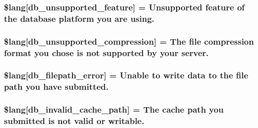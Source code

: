 \subsubsection[{\$lang}]{\setlength{\rightskip}{0pt plus 5cm}\$lang\mbox{[}\textquotesingle{}db\+\_\+unsupported\+\_\+feature\textquotesingle{}\mbox{]} = \textquotesingle{}Unsupported feature of the database platform you are using.\textquotesingle{}}\label{_admin_2system_2language_2english_2db__lang_8php_ac9a47dcf094e785346ea1834e63df941}
\hypertarget{_admin_2system_2language_2english_2db__lang_8php_ae745d23d59478f529442768816df6f36}{}
\subsubsection[{\$lang}]{\setlength{\rightskip}{0pt plus 5cm}\$lang\mbox{[}\textquotesingle{}db\+\_\+unsupported\+\_\+compression\textquotesingle{}\mbox{]} = \textquotesingle{}The file compression format you chose is not supported by your server.\textquotesingle{}}\label{_admin_2system_2language_2english_2db__lang_8php_ae745d23d59478f529442768816df6f36}
\hypertarget{_admin_2system_2language_2english_2db__lang_8php_a0519c50a806cec99f29b499aec2582e5}{}
\subsubsection[{\$lang}]{\setlength{\rightskip}{0pt plus 5cm}\$lang\mbox{[}\textquotesingle{}db\+\_\+filepath\+\_\+error\textquotesingle{}\mbox{]} = \textquotesingle{}Unable to write data to the file path you have submitted.\textquotesingle{}}\label{_admin_2system_2language_2english_2db__lang_8php_a0519c50a806cec99f29b499aec2582e5}
\hypertarget{_admin_2system_2language_2english_2db__lang_8php_a67157df2896b342e247ab744adf2b9e5}{}
\subsubsection[{\$lang}]{\setlength{\rightskip}{0pt plus 5cm}\$lang\mbox{[}\textquotesingle{}db\+\_\+invalid\+\_\+cache\+\_\+path\textquotesingle{}\mbox{]} = \textquotesingle{}The cache path you submitted is not valid or writable.\textquotesingle{}}\label{_admin_2system_2language_2english_2db__lang_8php_a67157df2896b342e247ab744adf2b9e5}
\hypertarget{_admin_2system_2language_2english_2db__lang_8php_a2899cf8f7246d7fa97660ea52856ade5}{}
